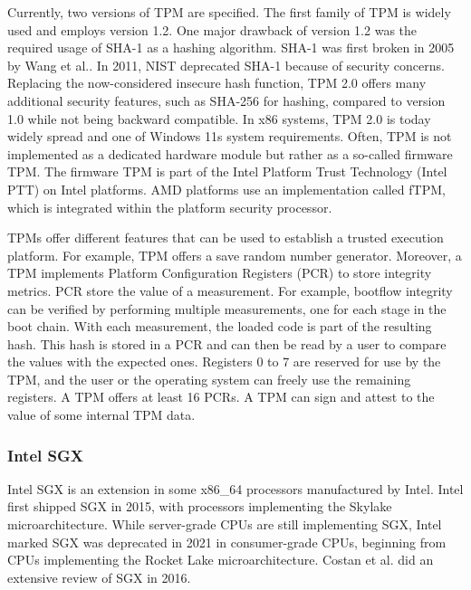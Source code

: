 Currently, two versions of TPM are specified. The first family of TPM is widely used and employs version 1.2. One major drawback
of version 1.2 was the required usage of SHA-1 as a hashing algorithm. SHA-1 was first broken in 2005 by Wang
et al.\cite{wang2005collision}. In 2011, NIST deprecated SHA-1 because of security concerns. Replacing the now-considered
insecure hash function, TPM 2.0 offers many additional security features, such as SHA-256 for hashing,
compared to version 1.0 while not being backward compatible. In x86 systems, TPM 2.0 is today widely spread and one of
Windows 11s system requirements. Often, TPM is not implemented as a dedicated hardware module but rather as a so-called
firmware TPM. The firmware TPM is part of the Intel Platform Trust Technology (Intel PTT) on Intel platforms. AMD
platforms use an implementation called fTPM, which is integrated within the platform security processor.\cite{pirker2024brief}

TPMs offer different features that can be used to establish a trusted execution platform. For example, TPM offers a save random number
generator. Moreover, a TPM implements Platform Configuration Registers (PCR) to store integrity metrics.
PCR store the value of a measurement. For example, bootflow integrity can be verified by performing multiple measurements,
one for each stage in the boot chain. With each measurement, the loaded code is part of the resulting hash. This hash is
stored in a PCR and can then be read by a user to compare the values with the expected ones. Registers 0 to 7 are
reserved for use by the TPM, and the user or the operating system can freely use the remaining registers. A TPM offers
at least 16 PCRs.
A TPM can sign and attest to the value of some internal TPM data.

\subsubsection{Intel SGX}
Intel SGX is an extension in some x86\_64 processors manufactured by Intel. Intel first shipped SGX in 2015, with
processors implementing the Skylake microarchitecture. While server-grade CPUs are still implementing SGX, Intel marked
SGX was deprecated in 2021 in consumer-grade CPUs, beginning from CPUs implementing the Rocket Lake microarchitecture.
Costan et al. did an extensive review of SGX in 2016.\cite{costan2016intel}

